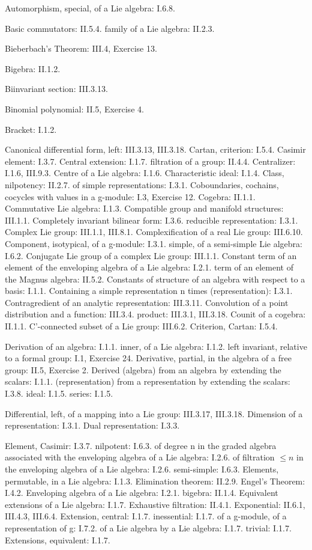 Automorphism, special, of a Lie algebra: I.6.8.

Basic commutators: II.5.4. family of a Lie algebra: II.2.3.

Bieberbach's Theorem: III.4, Exercise 13.

Bigebra: II.1.2.

Biinvariant section: III.3.13.

Binomial polynomial: II.5, Exercise 4.

Bracket: I.1.2.

Canonical differential form, left: III.3.13, III.3.18. Cartan, criterion: I.5.4. Casimir element: I.3.7. Central extension: I.1.7. filtration of a group: II.4.4. Centralizer: I.1.6, III.9.3. Centre of a Lie algebra: I.1.6. Characteristic ideal: I.1.4. Class, nilpotency: II.2.7. of simple representations: I.3.1. Coboundaries, cochains, cocycles with values in a g-module: I.3, Exercise 12. Cogebra: II.1.1. Commutative Lie algebra: I.1.3. Compatible group and manifold structures: III.1.1. Completely invariant bilinear form: I.3.6. reducible representation: I.3.1. Complex Lie group: III.1.1, III.8.1. Complexification of a real Lie group: III.6.10. Component, isotypical, of a g-module: I.3.1. simple, of a semi-simple Lie algebra: I.6.2. Conjugate Lie group of a complex Lie group: III.1.1. Constant term of an element of the enveloping algebra of a Lie algebra: I.2.1. term of an element of the Magnus algebra: II.5.2. Constants of structure of an algebra with respect to a basis: I.1.1. Containing a simple representation n times (representation): I.3.1. Contragredient of an analytic representation: III.3.11. Convolution of a point distribution and a function: III.3.4. product: III.3.1, III.3.18. Counit of a cogebra: II.1.1. C'-connected subset of a Lie group: III.6.2. Criterion, Cartan: I.5.4.

Derivation of an algebra: I.1.1. inner, of a Lie algebra: I.1.2. left invariant, relative to a formal group: I.1, Exercise 24. Derivative, partial, in the algebra of a free group: II.5, Exercise 2. Derived (algebra) from an algebra by extending the scalars: I.1.1. (representation) from a representation by extending the scalars: I.3.8. ideal: I.1.5. series: I.1.5.

Differential, left, of a mapping into a Lie group: III.3.17, III.3.18. Dimension of a representation: I.3.1. Dual representation: I.3.3.

Element, Casimir: I.3.7. nilpotent: I.6.3. of degree n in the graded algebra associated with the enveloping algebra of a Lie algebra: I.2.6. of filtration \(\leqslant n\) in the enveloping algebra of a Lie algebra: I.2.6. semi-simple: I.6.3. Elements, permutable, in a Lie algebra: I.1.3. Elimination theorem: II.2.9. Engel's Theorem: I.4.2. Enveloping algebra of a Lie algebra: I.2.1. bigebra: II.1.4. Equivalent extensions of a Lie algebra: I.1.7. Exhaustive filtration: II.4.1. Exponential: II.6.1, III.4.3, III.6.4. Extension, central: I.1.7. inessential: I.1.7. of a g-module, of a representation of g: I.7.2. of a Lie algebra by a Lie algebra: I.1.7. trivial: I.1.7. Extensions, equivalent: I.1.7.

